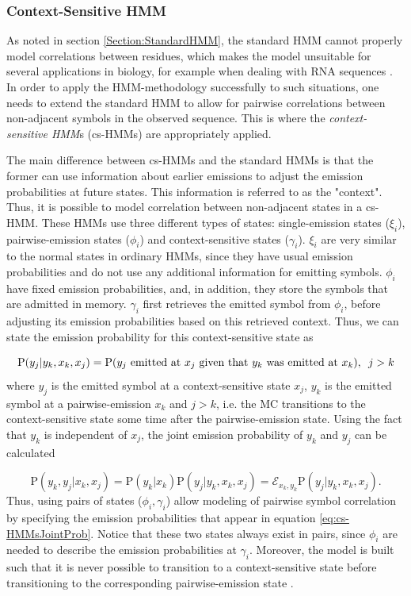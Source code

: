 \documentclass{article}
\begin{document}
\subsubsection{Context-Sensitive HMM}
As noted in section \ref{Section:StandardHMM}, the standard HMM cannot properly model correlations between residues, which makes the model unsuitable for several applications in biology, for example when dealing with RNA sequences \cite{Yoon2009}. In order to apply the HMM-methodology successfully to such situations, one needs to extend the standard HMM to allow for pairwise correlations between non-adjacent symbols in the observed sequence. This is where the \textit{context-sensitive HMM}s (cs-HMMs) are appropriately applied.

The main difference between cs-HMMs and the standard HMMs is that the former can use information about earlier emissions to adjust the emission probabilities at future states. This information is referred to as the "context". Thus, it is possible to model correlation between non-adjacent states in a cs-HMM. These HMMs use three different types of states: single-emission states ($\xi_i$),  pairwise-emission states ($\phi_i$) and context-sensitive states ($\gamma_i$). $\xi_i$ are very similar to the normal states in ordinary HMMs, since they have usual emission probabilities and do not use any additional information for emitting symbols. $\phi_i$ have fixed emission probabilities, and, in addition, they store the symbols that are admitted in memory. $\gamma_i$ first retrieves the emitted symbol from $\phi_i$, before adjusting its emission probabilities based on this retrieved context. Thus, we can state the emission probability for this context-sensitive state as 

\begin{equation*}
    \text{P}(y_j|y_k, x_k, x_j) = \text{P}(y_j\text{ emitted at }x_j\text{ given that }y_k\text{ was emitted at }x_k), \hspace{0.5em} j>k
\end{equation*}
where $y_j$ is the emitted symbol at a context-sensitive state $x_j$, $y_k$ is the emitted symbol at a pairwise-emission $x_k$ and $j>k$, i.e. the MC transitions to the context-sensitive state some time after the pairwise-emission state. Using the fact that $y_k$ is independent of $x_j$, the joint emission probability of $y_k$ and $y_j$ can be calculated

\begin{equation*}
    \text{P}(y_k, y_j|x_k, x_j) = \text{P}(y_k|x_k)\text{P}(y_j|y_k, x_k, x_j) = \mathcal{E}_{x_k, y_k}\text{P}(y_j|y_k, x_k, x_j).
    \label{eq:cs-HMMsJointProb}
\end{equation*}
Thus, using pairs of states ($\phi_i, \gamma_i$) allow modeling of pairwise symbol correlation by specifying the emission probabilities that appear in equation \eqref{eq:cs-HMMsJointProb}. Notice that these two states always exist in pairs, since $\phi_i$ are needed to describe the emission probabilities at $\gamma_i$. Moreover, the model is built such that it is never possible to transition to a context-sensitive state before transitioning to the corresponding pairwise-emission state \cite{Yoon2009}. 
\end{document}
